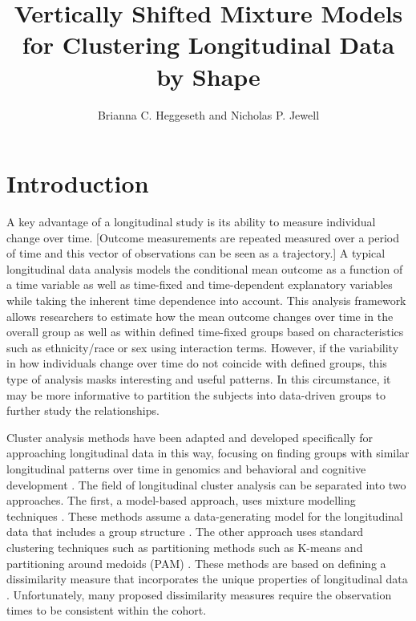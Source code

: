 \documentclass[12pt]{article}
\title{Vertically Shifted Mixture Models for Clustering Longitudinal Data by Shape}
\author{Brianna C. Heggeseth and Nicholas P. Jewell}
\begin{document}
\section{Introduction}
A key advantage of a longitudinal study is its ability to measure individual change over time. [Outcome measurements are repeated measured over a period of time and this vector of observations can be seen as a trajectory.] A typical longitudinal data analysis models the conditional mean outcome as a function of a time variable as well as time-fixed and time-dependent explanatory variables while taking the inherent time dependence into account. This analysis framework allows researchers to estimate how the mean outcome changes over time in the overall group as well as within defined time-fixed groups based on characteristics such as ethnicity/race or sex using interaction terms. However, if the variability in how individuals change over time do not coincide with defined groups, this type of analysis masks interesting and useful patterns. In this circumstance, it may be more informative to partition the subjects into data-driven groups to further study the relationships.

Cluster analysis methods have been adapted and developed specifically for approaching longitudinal data in this way, focusing on finding groups with similar longitudinal patterns over time in genomics and behavioral and cognitive development \cite{genolini2010, jones2001, muthen2010, mcnicholas2010,cruzmesia2008,ciampi2012}. The field of longitudinal cluster analysis can be separated into two approaches. The first, a model-based approach, uses mixture modelling techniques \cite{everitt1981,titterington1985,mclachlan1988,mclachlan2000,fruhwirth2006}. These methods assume a data-generating model for the longitudinal data that includes a group structure \cite{muthen2010,jones2001,leisch2004}. The other approach uses standard clustering techniques such as partitioning methods such as K-means \cite{macqueen1967,hartigan1979} and partitioning around medoids (PAM) \cite{kaufman1990}. These methods are based on defining a dissimilarity measure that incorporates the unique properties of longitudinal data \cite{genolini2010}.  Unfortunately, many proposed dissimilarity measures require the observation times to be consistent within the cohort. 
\end{document}
